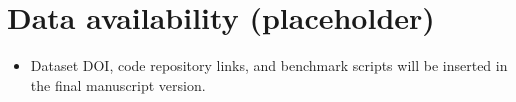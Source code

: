 \documentclass[final,3p,times]{elsarticle}
\begin{document}
\section*{Data availability (placeholder)}
\begin{itemize}[leftmargin=*]
\item Dataset DOI, code repository links, and benchmark scripts will be inserted in the final manuscript version.
\end{itemize}



%
\end{document}
